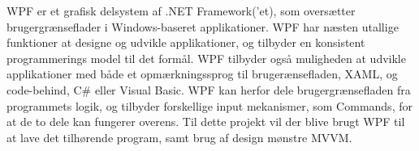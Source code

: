 WPF er et grafisk delsystem af .NET Framework(’et), som oversætter brugergrænseflader i Windows-baseret applikationer. WPF har næsten utallige funktioner at designe og udvikle applikationer, og tilbyder en konsistent programmerings model til det formål. WPF tilbyder også muligheden at udvikle applikationer med både et opmærkningssprog til brugerænsefladen, XAML, og code-behind, C# eller Visual Basic. WPF kan herfor dele brugergrænsefladen fra programmets logik, og tilbyder forskellige input mekanismer, som Commands, for at de to dele kan fungerer overens. Til dette projekt vil der blive brugt WPF til at lave det tilhørende program, samt brug af design mønstre MVVM. \cite{msdn2}